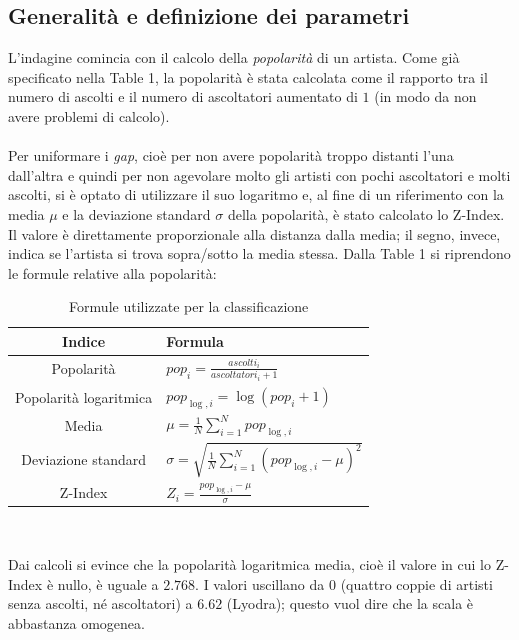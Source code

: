 \documentclass[sigchi]{acmart}
\begin{document}
\subsection{Generalità e definizione dei parametri}

L'indagine comincia con il calcolo della {\itshape popolarità} di un artista. Come già specificato nella Table 1, la popolarità è stata calcolata come il rapporto tra il numero di ascolti e il numero di ascoltatori aumentato di $1$ (in modo da non avere problemi di calcolo). \\ \\ Per uniformare i {\itshape gap}, cioè per non avere popolarità troppo distanti l'una dall'altra e quindi per non agevolare molto gli artisti con pochi ascoltatori e molti ascolti, si è optato di utilizzare il suo logaritmo e, al fine di un riferimento con la media $\mu$ e la deviazione standard $\sigma$ della popolarità, è stato calcolato lo Z-Index. Il valore è direttamente proporzionale alla distanza dalla media; il segno, invece, indica se l'artista si trova sopra/sotto la media stessa. Dalla Table 1 si riprendono le formule relative alla popolarità:

\begin{table}[H]
\centering
\begin{tabular}{|c|>{\centering\arraybackslash}p{4cm}|}
\hline
\textbf{Indice} & \textbf{Formula} \\
\hline
Popolarità &
$pop_i = \frac{ascolti_i}{ascoltatori_i + 1}$ \\
\hline
Popolarità logaritmica &
$pop_{\log,i} = \log(pop_i + 1)$ \\
\hline
Media &
$\mu = \frac{1}{N} \sum_{i=1}^{N} pop_{\log,i}$ \\
\hline
Deviazione standard &
$\sigma = \sqrt{\frac{1}{N} \sum_{i=1}^{N} (pop_{\log,i} - \mu)^2}$ \\
\hline
Z-Index &
$Z_i = \frac{pop_{\log,i} - \mu}{\sigma}$ \\
\hline
\end{tabular}\\[15pt]
\caption{Formule utilizzate per la classificazione}
\end{table}

\noindent Dai calcoli si evince che la popolarità logaritmica media, cioè il valore in cui lo Z-Index è nullo, è uguale a $2.768$. I valori uscillano da $0$ (quattro coppie di artisti senza ascolti, né ascoltatori) a $6.62$ (Lyodra); questo vuol dire che la scala è abbastanza omogenea.
\end{document}
